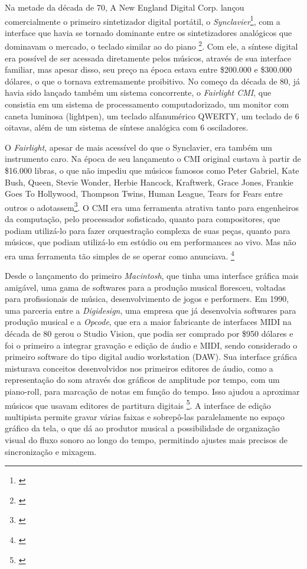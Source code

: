 Na metade da década de 70, A New England Digital Corp. lançou comercialmente o primeiro sintetizador digital portátil, o \emph{Synclavier}\footnote{\cite[265]{Holmes1985}}, com a interface que havia se tornado dominante entre os sintetizadores analógicos que dominavam o mercado, o teclado similar ao do piano \footnote{\cite{JosephParadiso1998}}. Com ele, a síntese digital era possível de ser acessada diretamente pelos músicos, através de sua interface familiar, mas apesar disso, seu preço na época estava entre \$200.000 e \$300.000 dólares, o que o tornava extremamente proibitivo. No começo da década de 80, já havia sido lançado também um sistema concorrente, o \emph{Fairlight CMI}, que consistia em um sistema de processamento computadorizado, um monitor com caneta luminosa (lightpen), um teclado alfanumérico QWERTY, um teclado de 6 oitavas, além de um sistema de síntese analógica com 6 osciladores.

O \emph{Fairlight}, apesar de mais acessível do que o Synclavier, era também um instrumento caro. Na época de seu lançamento o CMI original custava à partir de \$16.000 libras, o que não impediu que músicos famosos como Peter Gabriel, Kate Bush, Queen, Stevie Wonder, Herbie Hancock, Kraftwerk, Grace Jones, Frankie Goes To Hollywood, Thompson Twins, Human League, Tears for Fears entre outros o adotassem\footnote{\cite[18]{Twyman2004}}. O CMI era uma ferramenta atrativa tanto para engenheiros da computação, pelo processador sofisticado, quanto para compositores, que podiam utilizá-lo para fazer orquestração complexa de suas peças, quanto para músicos, que podiam utilizá-lo em estúdio ou em performances ao vivo. Mas não era uma ferramenta tão simples de se operar como anunciava. \footnote{\cite[55]{Twyman2004}}

Desde o lançamento do primeiro \emph{Macintosh}, que tinha uma interface gráfica mais amigável, uma gama de softwares para a produção musical floresceu, voltadas para profissionais de música, desenvolvimento de jogos e performers. Em 1990, uma parceria entre a \emph{Digidesign}, uma empresa que já desenvolvia softwares para produção musical e a \emph{Opcode}, que era a maior fabricante de interfaces MIDI na década de 80 gerou o Studio Vision, que podia ser comprado por \$950 dólares e foi o primeiro a integrar gravação e edição de áudio e MIDI, sendo considerado o primeiro software do tipo digital audio workstation (DAW). Sua interface gráfica misturava conceitos desenvolvidos nos primeiros editores de áudio, como a representação do som através dos gráficos de amplitude por tempo, com um piano-roll, para marcação de notas em função do tempo. Isso ajudou a aproximar músicos que usavam editores de partitura digitais \footnote{\cite{ChrisHalaby2011}}. A interface de edição multipista permite gravar várias faixas e sobrepô-las paralelamente no espaço gráfico da tela, o que dá ao produtor musical a possibilidade de organização visual do fluxo sonoro ao longo do tempo, permitindo ajustes mais precisos de sincronização e mixagem.

